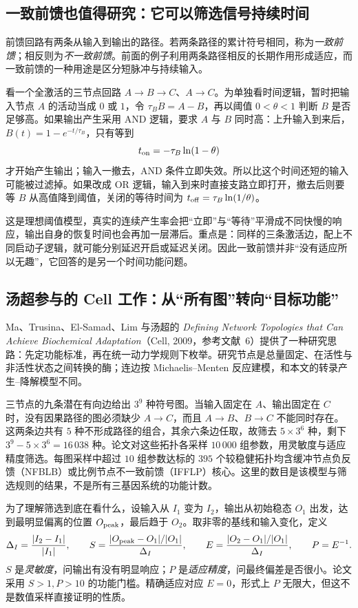 \documentclass[11pt,a4paper,UTF8,fontset=fandol]{ctexart}
\begin{document}
\subsection{一致前馈也值得研究：它可以筛选信号持续时间}
前馈回路有两条从输入到输出的路径。若两条路径的累计符号相同，称为\emph{一致前馈}；相反则为\emph{不一致前馈}。前面的例子利用两条路径相反的长期作用形成适应，而一致前馈的一种用途是区分短脉冲与持续输入。

看一个全激活的三节点回路 $A\to B\to C$、$A\to C$。为单独看时间逻辑，暂时把输入节点 $A$ 的活动当成 $0$ 或 $1$，令 $\tau_B\dot B=A-B$，再以阈值 $0<\theta<1$ 判断 $B$ 是否足够高。如果输出产生采用 AND 逻辑，要求 $A$ 与 $B$ 同时高：上升输入到来后，$B(t)=1-e^{-t/\tau_B}$，只有等到
\[
t_{\rm on}=-\tau_B\ln(1-\theta)
\]
才开始产生输出；输入一撤去，AND 条件立即失效。所以比这个时间还短的输入可能被过滤掉。如果改成 OR 逻辑，输入到来时直接支路立即打开，撤去后则要等 $B$ 从高值降到阈值，关闭的等待时间为 $t_{\rm off}=\tau_B\ln(1/\theta)$。

这是理想阈值模型，真实的连续产生率会把“立即”与“等待”平滑成不同快慢的响应，输出自身的恢复时间也会再加一层滞后。重点是：同样的三条激活边，配上不同启动子逻辑，就可能分别延迟开启或延迟关闭。因此一致前馈并非“没有适应所以无趣”，它回答的是另一个时间功能问题。

\subsection{汤超参与的 Cell 工作：从“所有图”转向“目标功能”}
Ma、Trusina、El-Samad、Lim 与汤超的 \emph{Defining Network Topologies that Can Achieve Biochemical Adaptation}（Cell, 2009，参考文献~6）提供了一种研究思路：先定功能标准，再在统一动力学规则下枚举。研究节点是总量固定、在活性与非活性状态之间转换的酶；连边按 Michaelis--Menten 反应建模，和本文的转录产生--降解模型不同。

三节点的九条潜在有向边给出 $3^9$ 种符号图。当输入固定在 $A$、输出固定在 $C$ 时，没有因果路径的图必须缺少 $A\to C$，而且 $A\to B$、$B\to C$ 不能同时存在。这两条边共有 $5$ 种不形成路径的组合，其余六条边任取，故筛去 $5\times3^6$ 种，剩下 $3^9-5\times3^6=16\,038$ 种。论文对这些拓扑各采样 $10\,000$ 组参数，用灵敏度与适应精度筛选。每图采样中超过 $10$ 组参数达标的 $395$ 个较稳健拓扑均含缓冲节点负反馈（NFBLB）或比例节点不一致前馈（IFFLP）核心。这里的数目是该模型与筛选规则的结果，不是所有三基因系统的功能计数。

为了理解筛选到底在看什么，设输入从 $I_1$ 变为 $I_2$，输出从初始稳态 $O_1$ 出发，达到最明显偏离的位置 $O_{\rm peak}$，最后趋于 $O_2$。取非零的基线和输入变化，定义
\[
\Delta_I=\frac{|I_2-I_1|}{|I_1|},\qquad
S=\frac{|O_{\rm peak}-O_1|/|O_1|}{\Delta_I},\qquad
E=\frac{|O_2-O_1|/|O_1|}{\Delta_I},\qquad P=E^{-1}.
\]
$S$ 是\emph{灵敏度}，问输出有没有明显响应；$P$ 是\emph{适应精度}，问最终偏差是否很小。论文采用 $S>1,P>10$ 的功能门槛。精确适应对应 $E=0$，形式上 $P$ 无限大，但这不是数值采样直接证明的性质。
\end{document}

